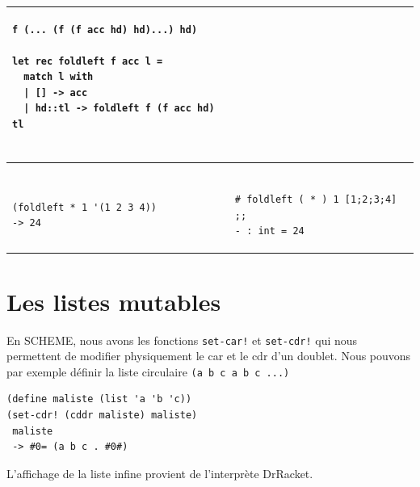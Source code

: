 \documentclass[11pt]{book}
\begin{document}
\begin{footnotesize}
\begin{tabular}{l|l}
\begin{minipage}{2.8in}
\begin{Verbatim}
f (... (f (f acc hd) hd)...) hd)

let rec foldleft f acc l =
  match l with
  | [] -> acc
  | hd::tl -> foldleft f (f acc hd) tl
  
\end{Verbatim}
\end{minipage} \\ \hline
\begin{minipage}{2.8in}
\begin{Verbatim}

(foldleft * 1 '(1 2 3 4))
-> 24

\end{Verbatim}
\end{minipage}
&
\begin{minipage}{3.0in}
\begin{Verbatim}

# foldleft ( * ) 1 [1;2;3;4] ;;
- : int = 24

\end{Verbatim}
\end{minipage} 

\end{tabular}

\end{footnotesize}
\section{Les listes mutables}

En SCHEME, nous avons les fonctions \verb+set-car!+ et \verb+set-cdr!+ qui nous permettent de modifier physiquement
 le car et le cdr d'un doublet.
Nous pouvons par exemple définir la liste circulaire \verb+(a b c a b c ...)+
\begin{Verbatim}
(define maliste (list 'a 'b 'c))
(set-cdr! (cddr maliste) maliste)
 maliste
 -> #0= (a b c . #0#)
\end{Verbatim}
L'affichage de la liste infine provient de l'interprète DrRacket.
\end{document}
